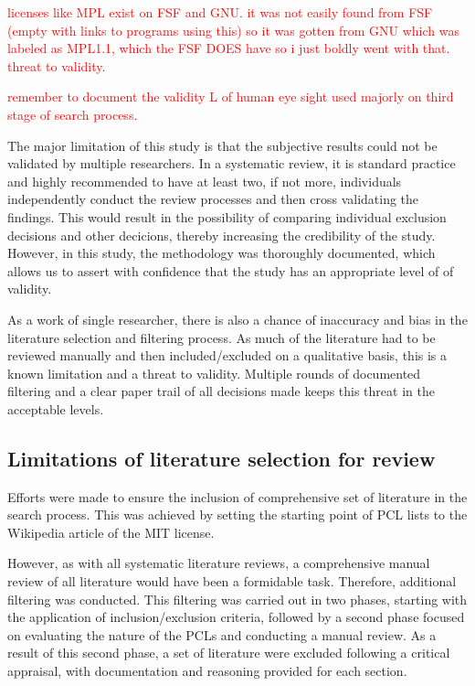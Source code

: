 \textcolor{red}{licenses like MPL exist on FSF and GNU. it was not easily found from FSF (empty with links to programs using this) so it was gotten from GNU which was labeled as MPL1.1, which the FSF DOES have so i just boldly went with that. threat to validity.}

\textcolor{red}{remember to document the validity L of human eye sight used majorly on third stage of search process.}

The major limitation of this study is that the subjective results could not be validated by multiple researchers. In a systematic review, it is standard practice and highly recommended to have at least two, if not more, individuals independently conduct the review processes and then cross validating the findings. This would result in the possibility of comparing individual exclusion decisions and other decicions, thereby increasing the credibility of the study. However, in this study, the methodology was thoroughly documented, which allows us to assert with confidence that the study has an appropriate level of of validity.

As a work of single researcher, there is also a chance of inaccuracy and bias in the literature selection and filtering process. As much of the literature had to be reviewed manually and then included/excluded on a qualitative basis, this is a known limitation and a threat to validity. Multiple rounds of documented filtering and a clear paper trail of all decisions made keeps this threat in the acceptable levels.

\subsection{Limitations of literature selection for review}
Efforts were made to ensure the inclusion of comprehensive set of literature in the search process. This was achieved by setting the starting point of PCL lists to the Wikipedia article of the MIT license.

However, as with all systematic literature reviews, a comprehensive manual review of all literature would have been a formidable task. Therefore, additional filtering was conducted. This filtering was carried out in two phases, starting with the application of inclusion/exclusion criteria, followed by a second phase focused on evaluating the nature of the PCLs and conducting a manual review. As a result of this second phase, a set of literature were excluded following a critical appraisal, with documentation and reasoning provided for each section.

